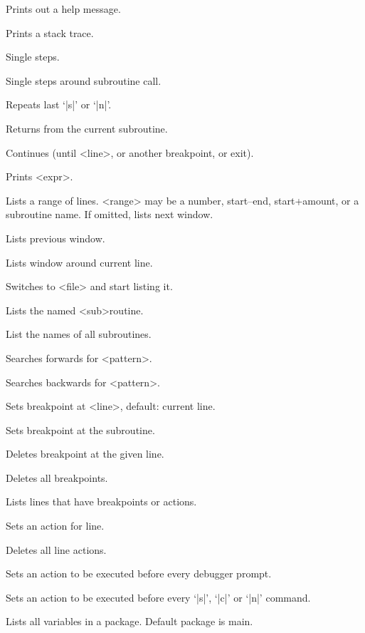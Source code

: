 \documentclass{refbase}
\begin{document}
\begin{enum}{2.5cm}

Prints out a help message.

Prints a stack trace.

Single steps.

Single steps around subroutine call.

Repeats last `|s|' or `|n|'.

Returns from the current subroutine.

Continues (until <line>, or another breakpoint, or exit).

Prints <expr>.

Lists a range of lines. <range> may be a number, start--end,
start+amount, or a subroutine name. If omitted, lists next window. 

\Xi{|-|}
Lists previous window.

Lists window around current line.

Switches to <file> and start listing it.

Lists the named <sub>routine.

List the names of all subroutines.

Searches forwards for <pattern>.

Searches backwards for <pattern>.

Sets breakpoint at <line>, default: current line.

Sets breakpoint at the subroutine.

Deletes breakpoint at the given line.

Deletes all breakpoints.

Lists lines that have breakpoints or actions.

Sets an action for line.

Deletes all line actions.

Sets an action to be executed before every debugger prompt.

Sets an action to be executed before every `|s|', `|c|' or `|n|' command.

Lists all variables in a package. Default package is main.


\end{enum}
\end{document}
